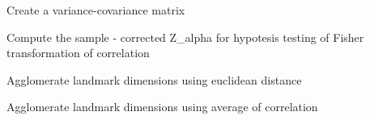 \documentclass[letterpaper,10pt,english]{sphinxmanual}
\begin{document}
\begin{fulllineitems}
\begin{fulllineitems}
\end{fulllineitems}


\begin{fulllineitems}
\label{Doc:Moduler.GMstats.UseCov}
Create a variance-covariance matrix

\end{fulllineitems}


\begin{fulllineitems}
\label{Doc:Moduler.GMstats.Z_fisher}
Compute the sample - corrected Z\_alpha for hypotesis testing of Fisher transformation of correlation

\end{fulllineitems}


\begin{fulllineitems}
\label{Doc:Moduler.GMstats.agglomerare_additive}
Agglomerate landmark dimensions using euclidean distance

\end{fulllineitems}


\begin{fulllineitems}
\label{Doc:Moduler.GMstats.agglomerare_mean}
Agglomerate landmark dimensions using average of correlation

\end{fulllineitems}


\end{fulllineitems}

\end{document}
